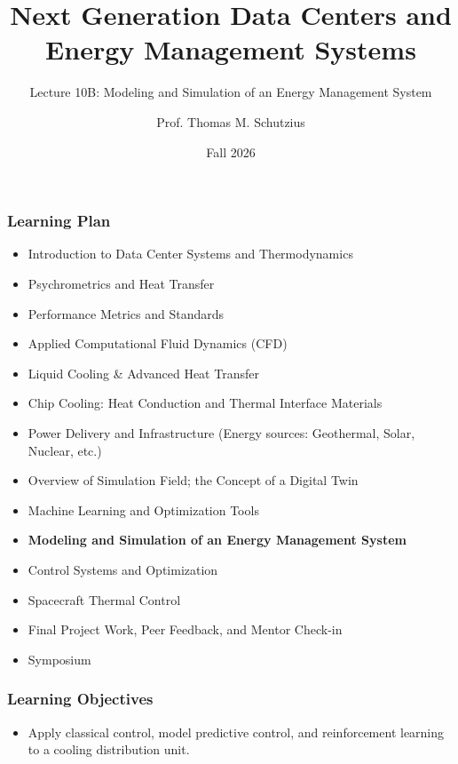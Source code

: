 \documentclass[aspectratio=169,10pt,xcolor={table,dvipsnames},t]{beamer}
\title[lecture 10]{Next Generation Data Centers and Energy Management Systems}
\subtitle{Lecture 10B: Modeling and Simulation of an Energy Management System}
\author{Prof. Thomas M. Schutzius}
\institute{Department of Mechanical Engineering}
\date{Fall 2026}
\begin{document}
\begin{frame}
  \titlepage
\end{frame}


{
\smallframetitle %

\begin{frame}
	\frametitle{Learning Plan}
	\begin{itemize}
		\item Introduction to Data Center Systems and Thermodynamics 
		\item Psychrometrics and Heat Transfer
		\item Performance Metrics and Standards
		\item Applied Computational Fluid Dynamics (CFD)
		\item Liquid Cooling \& Advanced Heat Transfer
		\item Chip Cooling: Heat Conduction and Thermal Interface Materials
		\item Power Delivery and Infrastructure (Energy sources: Geothermal, Solar, Nuclear, etc.)
		\item Overview of Simulation Field; the Concept of a Digital Twin
		\item Machine Learning and Optimization Tools
		\item \textbf{Modeling and Simulation of an Energy Management System}
		\item Control Systems and Optimization 
		\item Spacecraft Thermal Control
		\item Final Project Work, Peer Feedback, and Mentor Check-in 
		\item Symposium 
	\end{itemize}		
\end{frame}

\begin{frame}
	\frametitle{Learning Objectives} 
		\begin{itemize}
			\item Apply classical control, model predictive control, and reinforcement learning to a cooling distribution unit.
		\end{itemize}		
\end{frame}


}
\end{document}
